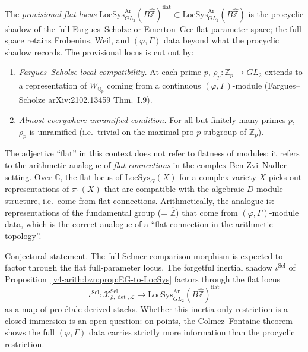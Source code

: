 \begin{definition}
\label{v4-arith:bzn:def:flat-locus}
The \emph{provisional flat locus}
\(\mathrm{LocSys}^{\mathrm{Ar}}_{GL_{2}}(B\widehat{\mathbb{Z}})^{\mathrm{flat}}\subset\mathrm{LocSys}^{\mathrm{Ar}}_{GL_{2}}(B\widehat{\mathbb{Z}})\)
is the procyclic shadow of the full Fargues--Scholze or Emerton--Gee
flat parameter space; the full space retains Frobenius, Weil, and
\((\varphi,\Gamma)\) data beyond what the procyclic shadow records.
The provisional locus is cut out by:
\begin{enumerate}
\item \emph{Fargues--Scholze local compatibility.} At each prime \(p\),
\(\rho_{p}\colon\mathbb{Z}_{p}\to GL_{2}\) extends to a representation
of \(W_{\mathbb{Q}_{p}}\) coming from a continuous \((\varphi,\Gamma)\)-module
(Fargues--Scholze arXiv:2102.13459 Thm.~I.9).
\item \emph{Almost-everywhere unramified condition.} For all but
finitely many primes \(p\), \(\rho_{p}\) is unramified (i.e.\ trivial
on the maximal pro-\(p\) subgroup of \(\mathbb{Z}_{p}\)).
\end{enumerate}
\end{definition}

\begin{remark}
\label{v4-arith:bzn:rem:flat-naming}
The adjective ``flat'' in this context does not refer to flatness
of modules; it refers to the arithmetic analogue of \emph{flat
connections} in the complex Ben-Zvi--Nadler setting. Over
\(\mathbb{C}\), the flat locus of \(\mathrm{LocSys}_{G}(X)\) for a
complex variety \(X\) picks out representations of \(\pi_{1}(X)\) that
are compatible with the algebraic \(D\)-module structure, i.e.\ come
from flat connections. Arithmetically, the analogue is:
representations of the fundamental group (= \(\widehat{\mathbb{Z}}\))
that come from \((\varphi,\Gamma)\)-module data, which is the correct
analogue of a ``flat connection in the arithmetic topology''.
\end{remark}

\begin{proposition}
\label{v4-arith:bzn:prop:EG-image-flat}
Conjectural statement. The full Selmer comparison morphism
is expected to factor through the flat full-parameter locus. The
forgetful inertial shadow \(\iota^{\mathrm{Sel}}\) of
Proposition~\ref{v4-arith:bzn:prop:EG-to-LocSys} factors through the flat
locus
\begin{equation}
\iota^{\mathrm{Sel}}\colon\mathcal{X}^{\mathrm{Sel}}_{\bar\rho,\det,\mathcal{L}}\longrightarrow\mathrm{LocSys}^{\mathrm{Ar}}_{GL_{2}}(B\widehat{\mathbb{Z}})^{\mathrm{flat}}
\end{equation}
as a map of pro-\'etale derived stacks. Whether this inertia-only
restriction is a closed immersion is an open question: on points, the
Colmez--Fontaine theorem shows the full \((\varphi,\Gamma)\) data carries
strictly more information than the procyclic restriction.
\end{proposition}

